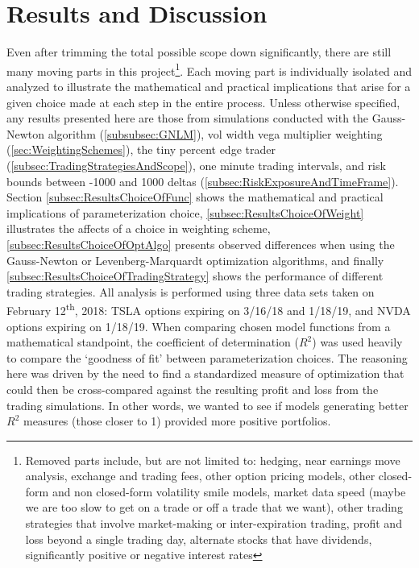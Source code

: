 \documentclass[12pt, a4paper, notitlepage]{article}
\numberwithin{equation}{subsection}
\numberwithin{figure}{subsection}
\numberwithin{table}{subsection}
\newcommand{\newpar}{\newline \newline}
\begin{document}
\newpage
\section{Results and Discussion} \label{sec:Results}
Even after trimming the total possible scope down significantly, there are still many moving parts in this project\footnote{Removed parts include, but are not limited to:  hedging, near earnings move analysis, exchange and trading fees, other option pricing models, other closed-form and non closed-form volatility smile models, market data speed (maybe we are too slow to get on a trade or off a trade that we want), other trading strategies that involve market-making or inter-expiration trading, profit and loss beyond a single trading day, alternate stocks that have dividends, significantly positive or negative interest rates}.  Each moving part is individually isolated and analyzed to illustrate the mathematical and practical implications that arise for a given choice made at each step in the entire process.
\newpar
Unless otherwise specified, any results presented here are those from simulations conducted with the Gauss-Newton algorithm (\ref{subsubsec:GNLM}), vol width vega multiplier weighting (\ref{sec:WeightingSchemes}), the tiny percent edge trader (\ref{subsec:TradingStrategiesAndScope}), one minute trading intervals, and risk bounds between -1000 and 1000 deltas (\ref{subsec:RiskExposureAndTimeFrame}).
\newpar
Section \ref{subsec:ResultsChoiceOfFunc} shows the mathematical and practical implications of parameterization choice, \ref{subsec:ResultsChoiceOfWeight} illustrates the affects of a choice in weighting scheme, \ref{subsec:ResultsChoiceOfOptAlgo} presents observed differences when using the Gauss-Newton or Levenberg-Marquardt optimization algorithms, and finally \ref{subsec:ResultsChoiceOfTradingStrategy} shows the performance of different trading strategies.  All analysis is performed using three data sets taken on February 12\textsuperscript{th}, 2018:  TSLA options expiring on 3/16/18 and 1/18/19, and NVDA options expiring on 1/18/19.
\newpar
When comparing chosen model functions from a mathematical standpoint, the coefficient of determination ($R^2$) was used heavily to compare the `goodness of fit' between parameterization choices.  The reasoning here was driven by the need to find a standardized measure of optimization that could then be cross-compared against the resulting profit and loss from the trading simulations.  In other words, we wanted to see if models generating better $R^2$ measures (those closer to 1) provided more positive portfolios.
\end{document}
